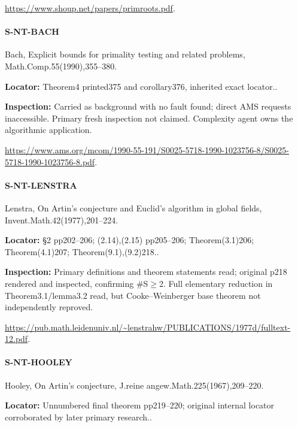 \documentclass[11pt,a4paper]{article}
\begin{document}
\url{https://www.shoup.net/papers/primroots.pdf}.

\paragraph{S-NT-BACH} Bach, Explicit bounds for primality testing and related problems, Math.\allowbreak{}Comp.\allowbreak{}55(1990),355–\allowbreak{}380.

\textbf{Locator:} Theorem4 printed375 and corollary376, inherited exact locator.\allowbreak{}.

\textbf{Inspection:} Carried as background with no fault found; direct AMS requests inaccessible.\allowbreak{} Primary fresh inspection not claimed.\allowbreak{} Complexity agent owns the algorithmic application.\allowbreak{}

\url{https://www.ams.org/mcom/1990-55-191/S0025-5718-1990-1023756-8/S0025-5718-1990-1023756-8.pdf}.

\paragraph{S-NT-LENSTRA} Lenstra, On Artin’s conjecture and Euclid’s algorithm in global fields, Invent.\allowbreak{}Math.\allowbreak{}42(1977),201–\allowbreak{}224.

\textbf{Locator:} §2 pp202–\allowbreak{}206; (2.\allowbreak{}14),(2.\allowbreak{}15) pp205–\allowbreak{}206; Theorem(3.\allowbreak{}1)206; Theorem(4.\allowbreak{}1)207; Theorem(9.\allowbreak{}1),(9.\allowbreak{}2)218.\allowbreak{}.

\textbf{Inspection:} Primary definitions and theorem statements read; original p218 rendered and inspected, confirming \#S\ensuremath{\ge}2.\allowbreak{} Full elementary reduction in Theorem3.\allowbreak{}1/\allowbreak{}lemma3.\allowbreak{}2 read, but Cooke–\allowbreak{}Weinberger base theorem not independently reproved.\allowbreak{}

\url{https://pub.math.leidenuniv.nl/~lenstrahw/PUBLICATIONS/1977d/fulltext-12.pdf}.

\paragraph{S-NT-HOOLEY} Hooley, On Artin’s conjecture, J.\allowbreak{}reine angew.\allowbreak{}Math.\allowbreak{}225(1967),209–\allowbreak{}220.

\textbf{Locator:} Unnumbered final theorem pp219–\allowbreak{}220; original internal locator corroborated by later primary research.\allowbreak{}.
\end{document}
